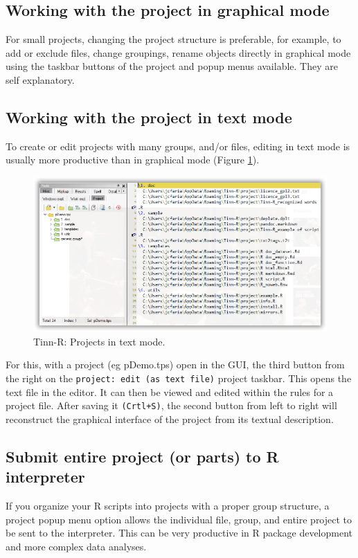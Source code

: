 \subsection{Working with the project in graphical mode}
For small projects, changing the project structure is preferable, for example, to add or exclude files, 
change groupings, rename objects directly in graphical mode using the taskbar buttons of the project
and popup menus available. They are self explanatory.

\subsection{Working with the project in text mode}
To create or edit projects with many groups, and/or files, editing in text mode is usually 
more productive than in graphical mode (Figure \ref{fig:tinn-r_projects_text_mode}).

\begin{figure}[H]
  \begin{center}
    \includegraphics[scale=0.60]{./res/projects_text_mode.png}
  \end{center}
  \caption{Tinn-R: Projects in text mode.}
  \label{fig:tinn-r_projects_text_mode}
\end{figure}

For this, with a project (eg pDemo.tps) open in the GUI, the third button from the right  
on the \texttt{project: edit (as text file)} project taskbar.  This opens the text file in the editor. 
It can then be viewed and edited within the rules for a project file.  
After saving it \texttt{(Crtl+S)}, the second button from left to right will reconstruct the  
graphical interface of the project from its textual description.

\subsection{Submit entire project (or parts) to R interpreter}
If you organize your R scripts into projects with a proper group structure, 
a project popup menu option allows the individual file, group, and entire project to be sent to the interpreter. 
This can be very productive in R package development and more complex data analyses.

